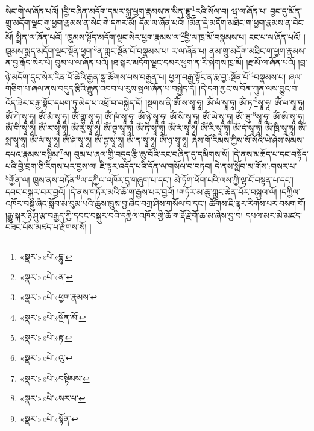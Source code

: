 སེང་གེ་ལ་ཞོན་པའོ། །བྱི་བཞིན་མདོག་དམར་སྐྱ་ཕྱག་རྣམས་ན་སིན་དྷཱུ་\footnote{«སྣར་»«པེ་»དྷུ་}རའི་སོལ་བ། ཝ་ལ་ཞོན་པ། བྱང་དུ་མོན་གྲུ་མདོག་ལྗང་གུ་ཕྱག་རྣམས་ན་སེང་གེ་དཀར་མོ། དོམ་ལ་ཞོན་པའོ། །མོན་དྲེ་མདོག་མཐིང་ག་ཕྱག་རྣམས་ན་བེང་མོ། སྤྲིན་ལ་ཞོན་པའོ། །ཁྲུམས་སྟོད་མདོག་ལྗང་སེར་ཕྱག་རྣམས་ལ་\footnote{«སྣར་»«པེ་»ན་}བྱི་ལ་ཁྲ་མོ་བསྣམས་པ། ངང་པ་ལ་ཞོན་པའོ། །ཁྲུམས་སྨད་མདོག་ལྗང་སྔོན་ཕྱག་\footnote{«སྣར་»«པེ་»ཕྱག་རྣམས་}ན་གླང་སྔོན་པོ་བསྣམས་པ། ར་ལ་ཞོན་པ། ནམ་གྲུ་མདོག་མཐིང་ག་ཕྱག་རྣམས་ན་བྱ་རྒོད་སེར་པོ། བུམ་པ་ལ་ཞོན་པའོ། །ཐ་སྐར་མདོག་ལྗང་དམར་ཕྱག་ན་རི་སྐེགས་ཁྲ་མོ། །རྔ་མོ་ལ་ཞོན་པའོ། །བྲ་ཉེ་མདོག་དུང་སེར་རིན་པོ་ཆེའི་རྒྱན་སྣ་ཚོགས་པས་བརྒྱན་པ། ཕྱག་བརྒྱ་སྟོང་ན་རྨ་བྱ་:སྔོན་པོ་\footnote{«སྣར་»«པེ་»སྔོན་མོ་}བསྣམས་པ། ཞལ་གཅིག་པ་ཞལ་ནས་བདུད་རྩིའི་རྒྱུན་འབབ་པ་རུས་སྦལ་ཞོན་པ་བསྐྱེད་དོ། །དེ་དག་ཀྱང་ས་བོན་ཀུན་ལས་བྱུང་བ་འོད་ཟེར་བརྒྱ་སྟོང་དཔག་ཏུ་མེད་པ་འཕྲོ་བ་བསྐྱེད་དོ། །སྔགས་ནི་ཨོཾ་ས་སྭཱ་ཧཱ། ཨོཾ་ལཾ་སྭཱ་ཧཱ། ཨོཾ་ཏ་\footnote{«སྣར་»«པེ་»རྟ་}སྭཱ་ཧཱ། ཨོཾ་ཕ་སྭཱ་ཧཱ། ཨོཾ་ཀེ་སྭཱ་ཧཱ། ཨོཾ་མཾ་སྭཱ་ཧཱ། ཨོཾ་གྷུ་སྭཱ་ཧཱ། ཨོཾ་ཁཾ་སྭཱ་ཧཱ། ཨོཾ་ཉེ་སྭཱ་ཧཱ། ཨོཾ་སི་སྭཱ་ཧཱ། ཨོཾ་ཡེ་སྭཱ་ཧཱ། ཨོཾ་ཝུ་\footnote{«སྣར་»«པེ་»འུ་}སྭཱ་ཧཱ། ཨོཾ་ཨི་སྭཱ་ཧཱ། ཨོཾ་གི་སྭཱ་ཧཱ། ཨོཾ་ར་སྭཱ་ཧཱ། ཨོཾ་རུ་སྭཱ་ཧཱ། ཨོཾ་བྷ་སྭཱ་ཧཱ། ཨོཾ་ཏེ་སྭཱ་ཧཱ། ཨོཾ་རཾ་སྭཱ་ཧཱ། ཨོཾ་རི་སྭཱ་ཧཱ། ཨོཾ་དཾ་སྭཱ་ཧཱ། ཨོཾ་ཁྲི་སྭཱ་ཧཱ། ཨོཾ་སྨ་སྭཱ་ཧཱ། ཨོཾ་ལཾ་སྭཱ་ཧཱ། ཨོཾ་ཤཾ་སྭཱ་ཧཱ། ཨོཾ་དྷ་སྭཱ་ཧཱ། ཨོཾ་ན་སྭཱ་ཧཱ། ཨོཾ་ཉ་སྭཱ་ཧཱ། ཞེས་གོ་རིམས་ཀྱིས་སོ་སོའི་ཡེ་ཤེས་སེམས་དཔའ་རྣམས་བསྟིམ་\footnote{«སྣར་»«པེ་»བསྟིམས་}ལ། བུམ་པ་ཞལ་གྱི་བདུད་རྩི་ཆུ་བོའི་རང་བཞིན་དུ་དམིགས་སོ། །དེ་ནས་མཆོད་པ་དང་བསྟོད་པའི་བྱེ་བྲག་ཅི་རིགས་པར་བྱས་ལ། ཇི་ལྟར་འདོད་པའི་དོན་ལ་གསོལ་བ་བཏབ། དེ་ནས་སློབ་མ་གོས་:གསར་པ་\footnote{«སྣར་»«པེ་»སར་པ་}གྱོན་ལ། ཁྲུས་ནས་བཏོན་\footnote{«སྣར་»«པེ་»སྟོན་}ལ་དཀྱིལ་འཁོར་དུ་གཞུག་པ་དང་། མེ་ཏོག་ཕོག་པའི་ལས་ཀྱི་ལྷ་ངོ་བསྟན་པ་དང་། དབང་བསྐུར་བར་བྱའོ། །དེ་ནས་གཏོར་མའི་ཆོ་ག་རྒྱས་པར་བྱའོ། །གཏོར་མ་ཆུ་ཀླུང་ཆེན་པོར་བསྐྱལ་ལོ། །དཀྱིལ་འཁོར་བསྡུ་ཞིང་སློབ་མ་བུམ་པའི་ཆུས་ཁྲུས་བྱ་ཞིང་བཀྲ་ཤིས་གསོལ་བ་དང་། ཚོགས་ཇི་ལྟར་རིགས་པར་བསག་གོ། །རྒྱུ་སྐར་ཉི་ཤུ་རྩ་བརྒྱད་ཀྱི་དབང་བསྐུར་བའི་དཀྱིལ་འཁོར་གྱི་ཆོ་ག་རྡོ་རྗེ་གོ་ཆ་མ་ཞེས་བྱ་བ། དཔལ་མར་མེ་མཛད་བཟང་པོས་མཛད་པ་རྫོགས་སོ། །